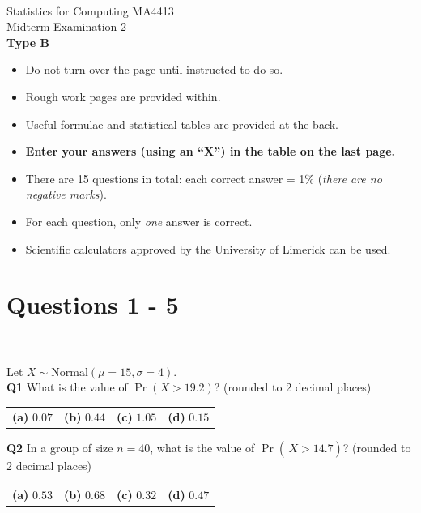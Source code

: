 \documentclass[12pt]{article}
\begin{document}
\quad\\[2cm]

\begin{center}
{\Huge Statistics for Computing MA4413\\[0.8cm]
Midterm Examination 2\\[1cm]
{\bf Type B}}\\[2cm]
\end{center}

\begin{itemize}\itemsep0.6cm
\item Do not turn over the page until instructed to do so.
\item Rough work pages are provided within.
\item Useful formulae and statistical tables are provided at the back.
\item {\bf Enter your answers (using an ``X'') in the table on the last page.}
\item There are 15 questions in total: each correct answer = 1\% (\emph{there are no negative marks}).
\item For each question, only \emph{one} answer is correct.
\item Scientific calculators approved by the University of Limerick can be used.
\end{itemize}

\newpage
\section*{Questions 1 - 5}


\rule{\linewidth}{1pt}
\quad\\
Let $X \sim \text{Normal}(\mu=15,\sigma=4)$.\\[0.2cm]

{\bf Q1} What is the value of $\Pr(X > 19.2)$? {\footnotesize(rounded to 2 decimal places)}\\[0.2cm]
\begin{tabular}{cccc}
{\bf(a)} $0.07$ & {\bf(b)} $0.44$ & {\bf(c)} $1.05$  & {\bf(d)} $0.15$ \\[0.6cm]
\end{tabular}

{\bf Q2} In a group of size $n=40$, what is the value of $\Pr(\,\overline{\!X} > 14.7)$? {\footnotesize(rounded to 2 decimal places)}\\[0.2cm]
\begin{tabular}{cccc}
{\bf(a)} $0.53$ & {\bf(b)} $0.68$ & {\bf(c)} $0.32$ & {\bf(d)} $0.47$  \\[0.6cm]
\end{tabular}
\end{document}
